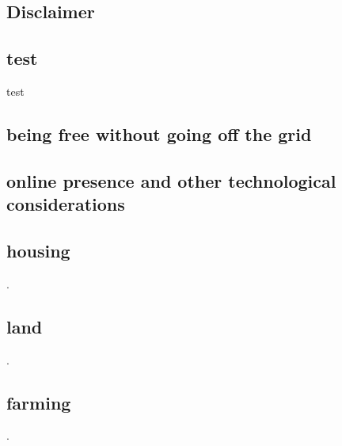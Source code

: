 \documentclass[a4paper,12pt,titlepage]{article}
\begin{document}
\begin{centering}
	\section{Disclaimer}
\end{centering}
%

\subsection{test}
test
\newpage
\begin{centering}
	\section{being free without going off the grid}
\end{centering}

\newpage
\begin{centering}
	\section{online presence and other technological considerations}
\end{centering}
\newpage

\newpage
\begin{centering}
	\section{housing}
\end{centering}
.

\newpage
\begin{centering}
	\section{land}
\end{centering}
.
\newpage
\begin{centering}
	\section{farming}
\end{centering}
.
\end{document}
